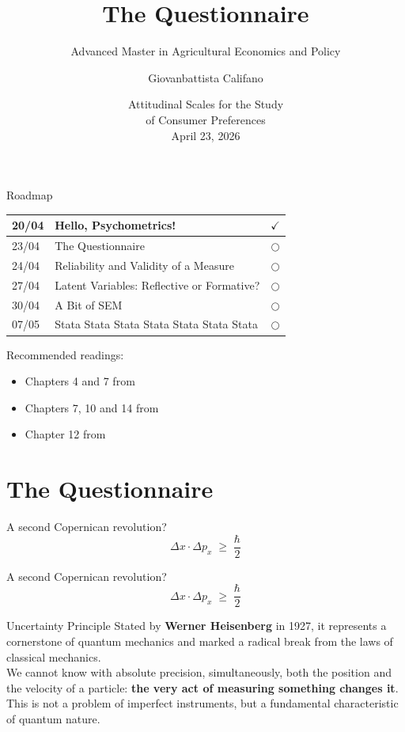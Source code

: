 \documentclass{beamer}
\title[Lecture 2]{The Questionnaire}
\subtitle{Advanced Master in Agricultural Economics and Policy}
\author{Giovanbattista Califano}
\date[Portici, 23/04/2026]{Attitudinal Scales for the Study \\ of Consumer Preferences \\ April 23, 2026}
\institute[UNINA]{University of Naples Federico II, giovanbattista.califano@unina.it}
\begin{document}
\frame{\titlepage}

\begin{frame}{Roadmap}
    \begin{center}
        \begin{tabular}{|l|l|c|}
        \hline
        20/04 &  Hello, Psychometrics! & $\checkmark$ \\
        \hline
        23/04 &  The Questionnaire & $\bigcirc$ \\
        \hline
        24/04 & Reliability and Validity of a Measure & $\bigcirc$ \\
        \hline
        27/04 & Latent Variables: Reflective or Formative? & $\bigcirc$ \\
        \hline
        30/04 & A Bit of SEM & $\bigcirc$ \\
        \hline
        07/05 & Stata Stata Stata Stata Stata Stata Stata & $\bigcirc$ \\
        \hline
        \end{tabular}
    \end{center}
\vspace{0.1cm}
\footnotesize
Recommended readings: \\
\begin{itemize}
    \item Chapters 4 and 7 from \cite{jhangiani2019research}
    \item Chapters 7, 10 and 14 from \cite{olivero2022psicologia}
    \item Chapter 12 from \cite{mehmetoglu2022applied}
\end{itemize}
\scriptsize


\end{frame}

\section{The Questionnaire}
\begin{frame}{A second Copernican revolution?}
\huge
    \[
      \Delta x \cdot \Delta p_x \;\ge\; \frac{\hbar}{2}
    \]
\end{frame}

\begin{frame}{A second Copernican revolution?}
    \[
      \Delta x \cdot \Delta p_x \;\ge\; \frac{\hbar}{2}
    \]
\begin{block}{Uncertainty Principle}
\small
    Stated by \textbf{Werner Heisenberg} in 1927, it represents a cornerstone of quantum mechanics and marked a radical break from the laws of classical mechanics. \\
    \smallskip
    We cannot know with absolute precision, simultaneously, both the position and the velocity of a particle: \textbf{the very act of measuring something changes it}. This is not a problem of imperfect instruments, but a fundamental characteristic of quantum nature.
\end{block}
\end{frame}
\end{document}
